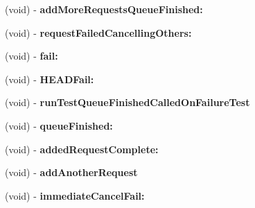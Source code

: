 \begin{DoxyCompactItemize}
\item 
\hypertarget{interface_a_s_i_network_queue_tests_07_08_abe54bb28f6c58b48f2e136adebe7591c}{
(void) -\/ {\bfseries add\-More\-Requests\-Queue\-Finished\-:}}
\label{interface_a_s_i_network_queue_tests_07_08_abe54bb28f6c58b48f2e136adebe7591c}

\item 
\hypertarget{interface_a_s_i_network_queue_tests_07_08_ac13a2a0cfd430c066079f46e968de949}{
(void) -\/ {\bfseries request\-Failed\-Cancelling\-Others\-:}}
\label{interface_a_s_i_network_queue_tests_07_08_ac13a2a0cfd430c066079f46e968de949}

\item 
\hypertarget{interface_a_s_i_network_queue_tests_07_08_a672f203e09f2d4f39fb2f1824cd85443}{
(void) -\/ {\bfseries fail\-:}}
\label{interface_a_s_i_network_queue_tests_07_08_a672f203e09f2d4f39fb2f1824cd85443}

\item 
\hypertarget{interface_a_s_i_network_queue_tests_07_08_abebd73c6087a317cf7d40a0694fa0554}{
(void) -\/ {\bfseries \-H\-E\-A\-D\-Fail\-:}}
\label{interface_a_s_i_network_queue_tests_07_08_abebd73c6087a317cf7d40a0694fa0554}

\item 
\hypertarget{interface_a_s_i_network_queue_tests_07_08_a863286b45c212a9aff1fd8c9415e8eb8}{
(void) -\/ {\bfseries run\-Test\-Queue\-Finished\-Called\-On\-Failure\-Test}}
\label{interface_a_s_i_network_queue_tests_07_08_a863286b45c212a9aff1fd8c9415e8eb8}

\item 
\hypertarget{interface_a_s_i_network_queue_tests_07_08_a7d969cf7beaae41da4ec7ee5d2f524d4}{
(void) -\/ {\bfseries queue\-Finished\-:}}
\label{interface_a_s_i_network_queue_tests_07_08_a7d969cf7beaae41da4ec7ee5d2f524d4}

\item 
\hypertarget{interface_a_s_i_network_queue_tests_07_08_ab8add5e0479640989a141e56dfcf046a}{
(void) -\/ {\bfseries added\-Request\-Complete\-:}}
\label{interface_a_s_i_network_queue_tests_07_08_ab8add5e0479640989a141e56dfcf046a}

\item 
\hypertarget{interface_a_s_i_network_queue_tests_07_08_a7f9925729daa7cce26bd2301d1b86c2b}{
(void) -\/ {\bfseries add\-Another\-Request}}
\label{interface_a_s_i_network_queue_tests_07_08_a7f9925729daa7cce26bd2301d1b86c2b}

\item 
\hypertarget{interface_a_s_i_network_queue_tests_07_08_ab7c057d1956cb3bda4f21d43260ee1a7}{
(void) -\/ {\bfseries immediate\-Cancel\-Fail\-:}}
\label{interface_a_s_i_network_queue_tests_07_08_ab7c057d1956cb3bda4f21d43260ee1a7}


\end{DoxyCompactItemize}
